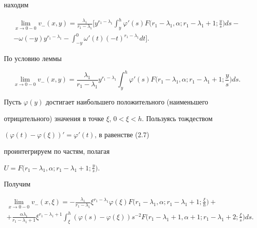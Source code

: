 находим 


\begin{multline} 


\lim_{x\to0-0}v_-(x,y)=\frac{\lambda_1}{r_1-\lambda_1}\bigg[ 


y^{r_1-\lambda_1}\int^h_y \varphi'(s)F\bigg(r_1-\lambda_1,\alpha; 


r_1-\lambda_1+1;\frac{y}{s}\bigg)d s- \\


-\omega(-y)y^{r_1-\lambda_1}- 


\int^0_{-y}\omega'(t)(-t)^{r_1-\lambda_1}d t\bigg]. 


\end{multline} 


 


По условию леммы 


\begin{equation} 


\lim_{x\to0-0}v_-(x,y)=\frac{\lambda_1}{r_1-\lambda_1} 


y^{r_1-\lambda_1}\int^h_y \varphi'(s)F\bigg(r_1-\lambda_1,\alpha; 


r_1-\lambda_1+1;\frac{y}{s}\bigg)d s. 


\end{equation} 


 


Пусть $\varphi(y)$ достигает наибольшего положительного (наименьшего 


отрицательного) значения в точке $\xi$, $0<\xi<h$. Пользуясь тождеством 


$(\varphi(t)-\varphi(\xi))'=\varphi'(t)$, в равенстве (2.7) 


проинтегрируем по частям, полагая 


$U=F\big(r_1-\lambda_1,\alpha;r_1-\lambda_1+1;\frac{y}{s}\big)$. 


Получим 


\begin{multline*} 


\lim_{x\to0-0}v_-(x,\xi)=-\frac{\lambda_1}{r_1-\lambda_1} 


\xi^{r_1-\lambda_1}\varphi(\xi)F\bigg(r_1-\lambda_1,\alpha; 


r_1-\lambda_1+1;\frac{\xi}{h}\bigg)+ \\ 


% 


+\frac{\alpha\lambda_1}{r_1-\lambda_1+1}\xi^{r_1-\lambda_1+1} 


\int^h_\xi(\varphi(s)-\varphi(\xi))s^{-2}F\bigg(r_1-\lambda_1+1, 


\alpha+1;r_1-\lambda_1+2;\frac{\xi}{s}\bigg)d s. 


\end{multline*} 


